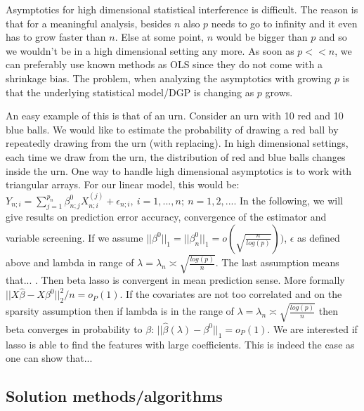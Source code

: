 \documentclass{article}
\theoremstyle{definition}
\begin{document}
Asymptotics for high dimensional statistical interference is difficult. The reason is that for a meaningful analysis, besides $n$ also $p$ needs to go to infinity and it even has to grow faster than $n$. Else at some point, $n$ would be bigger than $p$ and so we wouldn't be in a high dimensional setting any more. As soon as $p << n$, we can preferably use known methods as OLS since they do not come with a shrinkage bias.  
The problem, when analyzing the asymptotics with growing $p$ is that the underlying statistical model/DGP is changing as $p$ grows. 
\bigskip

An easy example of this is that of an urn. Consider an urn with 10 red and 10 blue balls. We would like to estimate the probability of drawing a red ball by repeatedly drawing from the urn (with replacing). In high dimensional settings, each time we draw from the urn, the distribution of red and blue balls changes inside the urn. One way to handle high dimensional asymptotics is to work with triangular arrays.  For our linear model, this would be: $Y_{n;i}=\sum^{p_n}_{j=1}\beta^0_{n;j}X^{(j)}_{n;i}+\epsilon_{n;i}, \ i=1,...,n; \ n=1,2,...$. In the following, we will give results on prediction error accuracy, convergence of the estimator and variable screening. 
If we assume $||\beta^0||_1=||\beta_n^0||_1=o(\sqrt{\frac{n}{log(p)}}))$, $\epsilon$ as defined above and lambda in range of $\lambda=\lambda_n\asymp\sqrt{\frac{log(p)}{n}}$. The last assumption means that... . Then beta lasso is convergent in mean prediction sense. More formally $||X\hat{\beta}-X\beta^0||_2^2/n=o_P(1)$.
If the covariates are not too correlated and on the sparsity assumption then if lambda is in the range of $\lambda=\lambda_n\asymp\sqrt{\frac{log(p)}{n}}$ then beta converges in probability to $\beta$: $||\hat{\beta}(\lambda)-\beta^0||_1=o_P(1)$. 
We are interested if lasso is able to find the features with large coefficients. This is indeed the case as one can show that...


\subsection{Solution methods/algorithms}
\end{document}
